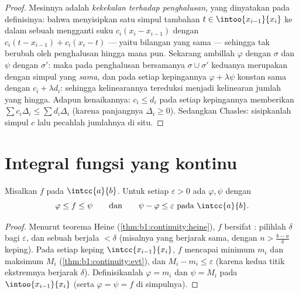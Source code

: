 \begin{proof}
Mesinnya adalah \emph{kekekalan terhadap penghalusan}, yang dinyatakan pada
definisinya: bahwa menyisipkan satu simpul tambahan $t \in \intoo{x_{i-1}}{x_i}$
ke dalam sebuah  mengganti suku $c_i(x_i - x_{i-1})$ dengan
$c_i(t - x_{i-1}) + c_i(x_i - t)$ --- yaitu bilangan yang sama --- sehingga
 tak berubah oleh penghalusan hingga mana pun. Sekarang ambillah
$\varphi$ dengan  $\sigma$ dan $\psi$ dengan 
$\sigma'$: maka pada penghalusan bersamanya $\sigma \cup \sigma'$ keduanya
merupakan  dengan simpul yang \emph{sama}, dan pada setiap kepingannya
$\varphi + \lambda\psi$ konstan sama dengan $c_i + \lambda
d_i$: sehingga kelinearannya tereduksi menjadi kelinearan jumlah yang hingga. Adapun kenaikannya:
$c_i \leq d_i$ pada setiap kepingannya memberikan $\sum c_i \Delta_i \leq \sum
d_i \Delta_i$ (karena panjangnya $\Delta_i \geq 0$). Sedangkan Chasles: sisipkanlah
simpul $c$ lalu pecahlah jumlahnya di situ.
\end{proof}

\section{Integral fungsi yang kontinu}

\begin{theorem}\label{thm:b1:integration:approx}
Misalkan $f$  pada $\intcc{a}{b}$. Untuk setiap $\varepsilon > 0$
ada  $\varphi, \psi$ dengan
\[
\varphi \leq f \leq \psi
\qquad\text{dan}\qquad
\psi - \varphi \leq \varepsilon \text{ pada } \intcc{a}{b}.
\]
\end{theorem}

\begin{proof}
Menurut teorema Heine (\cref{thm:b1:continuity:heine}), $f$ bersifat : pilihlah $\delta$ bagi $\varepsilon$, dan sebuah 
berjala $< \delta$ (misalnya yang berjarak sama, dengan $n > \frac{b -
a}{\delta}$ keping). Pada setiap keping  $\intcc{x_{i-1}}{x_i}$, $f$
mencapai minimum $m_i$ dan maksimum $M_i$
(\cref{thm:b1:continuity:evt}), dan $M_i - m_i \leq \varepsilon$
(karena kedua titik ekstremnya berjarak $\delta$). Definisikanlah $\varphi = m_i$
dan $\psi = M_i$ pada $\intoo{x_{i-1}}{x_i}$ (serta $\varphi = \psi = f$
di simpulnya).
\end{proof}

